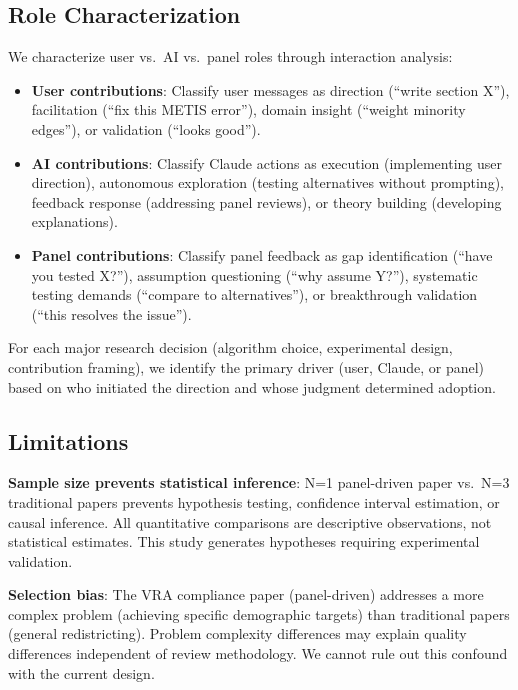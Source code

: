 \subsection{Role Characterization}

We characterize user vs.\ AI vs.\ panel roles through interaction analysis:

\begin{itemize}[leftmargin=*]
\item \textbf{User contributions}: Classify user messages as direction (``write section X''), facilitation (``fix this METIS error''), domain insight (``weight minority edges''), or validation (``looks good'').

\item \textbf{AI contributions}: Classify Claude actions as execution (implementing user direction), autonomous exploration (testing alternatives without prompting), feedback response (addressing panel reviews), or theory building (developing explanations).

\item \textbf{Panel contributions}: Classify panel feedback as gap identification (``have you tested X?''), assumption questioning (``why assume Y?''), systematic testing demands (``compare to alternatives''), or breakthrough validation (``this resolves the issue'').
\end{itemize}

For each major research decision (algorithm choice, experimental design, contribution framing), we identify the primary driver (user, Claude, or panel) based on who initiated the direction and whose judgment determined adoption.

\subsection{Limitations}

\textbf{Sample size prevents statistical inference}: N=1 panel-driven paper vs.\ N=3 traditional papers prevents hypothesis testing, confidence interval estimation, or causal inference. All quantitative comparisons are descriptive observations, not statistical estimates. This study generates hypotheses requiring experimental validation.

\textbf{Selection bias}: The VRA compliance paper (panel-driven) addresses a more complex problem (achieving specific demographic targets) than traditional papers (general redistricting). Problem complexity differences may explain quality differences independent of review methodology. We cannot rule out this confound with the current design.

